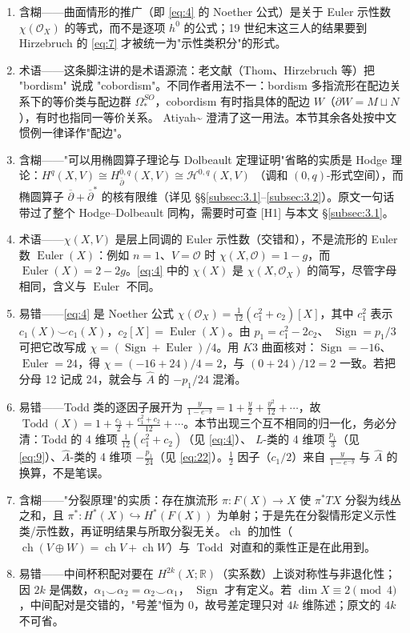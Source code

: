 \documentclass[11pt]{amsart}
\theoremstyle{definition}
\theoremstyle{remark}
\theoremstyle{plain}
\numberwithin{equation}{section}
\renewcommand{\:}{\colon}
\newcommand{\Ahat}{{\hat A}}
\newcommand{\RR}{{\mathbb R}}
\DeclareMathOperator{\ch}{ch}
\newcommand{\dbar}{{\overline\partial}}
\DeclareMathOperator{\Euler}{Euler}
\DeclareMathOperator{\Sign}{Sign}
\DeclareMathOperator{\Todd}{Todd}
\newcommand{\sO}{\mathcal{O}}
\begin{document}
\begin{enumerate}[leftmargin=2.2em,itemsep=2pt,topsep=2pt]
  \item 含糊——曲面情形的推广（即 \eqref{eq:4} 的 Noether 公式）是关于 Euler 示性数 $\chi(\sO_X)$ 的等式，而不是逐项 $h^0$ 的公式；19 世纪末这三人的结果要到 Hirzebruch 的 \eqref{eq:7} 才被统一为"示性类积分"的形式。
  \item 术语——这条脚注讲的是术语源流：老文献（Thom、Hirzebruch 等）把 "bordism" 说成 "cobordism"。不同作者用法不一：bordism 多指流形在配边关系下的等价类与配边群 $\Omega_*^{SO}$，cobordism 有时指具体的配边 $W$（$\partial W=M\sqcup N$），有时也指同一等价关系。 Atiyah\textasciitilde{}\cite{A10} 澄清了这一用法。本节其余各处按中文惯例一律译作"配边"。
  \item 含糊——"可以用椭圆算子理论与 Dolbeault 定理证明"省略的实质是 Hodge 理论：$H^q(X,V)\cong H^{0,q}_{\bar\partial}(X,V)\cong\mathcal H^{0,q}(X,V)$ （调和 $(0,q)$-形式空间），而椭圆算子 $\dbar+\dbar^*$ 的核有限维（详见 \S\S\ref{subsec:3.1}--\ref{subsec:3.2}）。原文一句话带过了整个 Hodge–Dolbeault 同构，需要时可查 [H1] 与本文 \S\ref{subsec:3.1}。
  \item 术语——$\chi(X,V)$ 是层上同调的 Euler 示性数（交错和），不是流形的 Euler 数 $\Euler(X)$：例如 $n=1$、$V=\sO$ 时 $\chi(X,\sO)=1-g$，而 $\Euler(X)=2-2g$。\eqref{eq:4} 中的 $\chi(X)$ 是 $\chi(X,\sO_X)$ 的简写，尽管字母相同，含义与 $\Euler$ 不同。
  \item 易错——\eqref{eq:4} 是 Noether 公式 $\chi(\sO_X)=\frac1{12}(c_1^2+c_2)[X]$，其中 $c_1^2$ 表示 $c_1(X)\smile c_1(X)$，$c_2[X]=\Euler(X)$。由 $p_1=c_1^2-2c_2$、 $\Sign=p_1/3$ 可把它改写成 $\chi=(\Sign+\Euler)/4$。用 $K3$ 曲面核对：$\Sign=-16$、 $\Euler=24$，得 $\chi=(-16+24)/4=2$，与 $(0+24)/12=2$ 一致。若把分母 12 记成 24，就会与 $\Ahat$ 的 $-p_1/24$ 混淆。
  \item 易错——Todd 类的逐因子展开为 $\frac{y}{1-e^{-y}}=1+\frac y2+\frac{y^2}{12}+\cdots$，故 $\Todd(X)=1+\frac{c_1}{2}+\frac{c_1^2+c_2}{12}+\cdots$。本节出现三个互不相同的归一化，务必分清：Todd 的 4 维项 $\frac1{12}(c_1^2+c_2)$（见 \eqref{eq:4}）、 $L$-类的 4 维项 $\frac{p_1}{3}$（见 \eqref{eq:9}）、$\Ahat$-类的 4 维项 $-\frac{p_1}{24}$（见 \eqref{eq:22}）。$\frac12$ 因子（$c_1/2$）来自 $\frac{y}{1-e^{-y}}$ 与 $\Ahat$ 的换算，不是笔误。
  \item 含糊——"分裂原理"的实质：存在旗流形 $\pi:F(X)\to X$ 使 $\pi^*TX$ 分裂为线丛之和，且 $\pi^*:H^*(X)\hookrightarrow H^*(F(X))$ 为单射；于是先在分裂情形定义示性类/示性数，再证明结果与所取分裂无关。$\ch$ 的加性（$\ch(V\oplus W)=\ch V+\ch W$）与 $\Todd$ 对直和的乘性正是在此用到。
  \item 易错——中间杯积配对要在 $H^{2k}(X;\RR)$（实系数）上谈对称性与非退化性；因 $2k$ 是偶数，$\alpha_1\smile\alpha_2=\alpha_2\smile\alpha_1$， $\Sign$ 才有定义。若 $\dim X\equiv2\pmod4$，中间配对是交错的，"号差"恒为 0，故号差定理只对 $4k$ 维陈述；原文的 $4k$ 不可省。

\end{enumerate}
\end{document}
